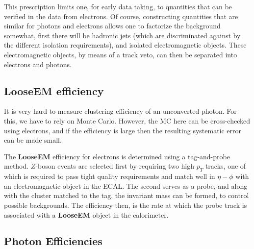 \documentclass{cmspaper}
\begin{document}
This prescription limits one, for early data taking, to quantities that can be verified in the data from electrons.  Of course, constructing quantities that are similar for photons and electrons allows one to factorize the background somewhat, first there will be hadronic jets (which are discriminated against by the different isolation requirements), and isolated electromagnetic objects.  These electromagnetic objects, by means of a track veto, can then be separated into electrons and photons. 
\subsection{LooseEM efficiency}\label{ssec:LooseEMEff}

It is very hard to measure clustering efficiency of an unconverted photon. For this, we have to rely on Monte Carlo.
However, the MC here can be cross-checked using electrons, and if the efficiency is large then the resulting systematic error can be made small. 

The {\bf LooseEM} efficiency for electrons is determined using a tag-and-probe method.  $Z$-boson events are selected first by requiring two high $p_T$ tracks, one of which is required to pass tight quality requirements and match well in $\eta-\phi$ with an electromagnetic object in the ECAL.  The second serves as a probe, and along with the cluster matched to the tag, the invariant mass can be formed, to control possible backgrounds.  The efficiency then, is the rate at which the probe track is associated with a {\bf LooseEM} object in the calorimeter.

\subsection{Photon Efficiencies}
\end{document}
